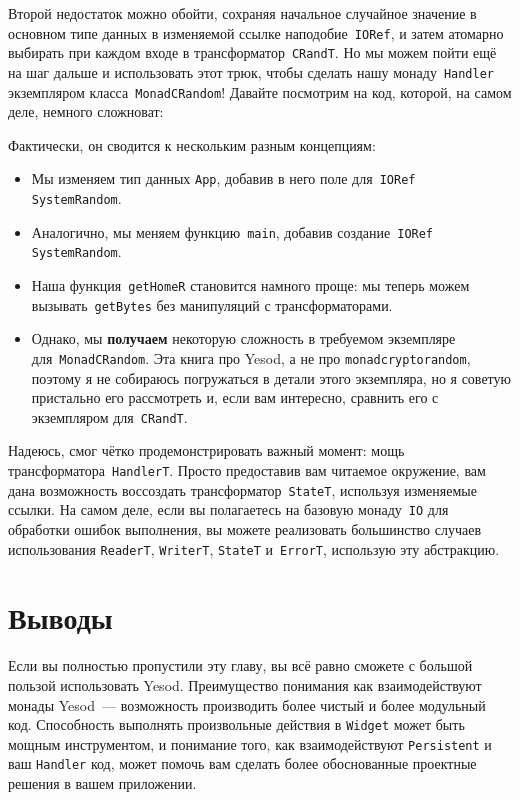 Второй недостаток можно обойти, сохраняя начальное случайное значение в
основном типе данных в изменяемой ссылке наподобие~\lstinline'IORef', и затем
атомарно выбирать при каждом входе в трансформатор~\lstinline'CRandT'. Но мы
можем пойти ещё на шаг дальше и использовать этот трюк, чтобы сделать нашу
монаду~\lstinline'Handler' экземпляром класса~\lstinline'MonadCRandom'!
Давайте посмотрим на код, которой, на самом деле, немного сложноват:


Фактически, он сводится к нескольким разным концепциям:
\begin{itemize}
    \item Мы изменяем тип данных \lstinline'App', добавив в него поле
        для~\lstinline'IORef SystemRandom'.

    \item Аналогично, мы меняем функцию~\lstinline'main', добавив
        создание~\lstinline'IORef SystemRandom'.

    \item Наша функция~\lstinline'getHomeR' становится намного проще: мы теперь
        можем вызывать~\lstinline'getBytes' без манипуляций с трансформаторами.

    \item Однако, мы \textbf{получаем} некоторую сложность в требуемом
        экземпляре для~\lstinline'MonadCRandom'. Эта книга про Yesod, а не про
        \texttt{monadcryptorandom}, поэтому я не собираюсь погружаться в детали
        этого экземпляра, но я советую пристально его рассмотреть и, если вам
        интересно, сравнить его с экземпляром для~\lstinline'CRandT'.
\end{itemize}

Надеюсь, смог чётко продемонстрировать важный момент: мощь
трансформатора~\lstinline'HandlerT'. Просто предоставив вам читаемое окружение,
вам дана возможность воссоздать трансформатор~\lstinline'StateT', используя
изменяемые ссылки. На самом деле, если вы полагаетесь на базовую
монаду~\lstinline'IO' для обработки ошибок выполнения, вы можете реализовать
большинство случаев использования \lstinline'ReaderT', \lstinline'WriterT',
\lstinline'StateT' и~\lstinline'ErrorT', использую эту абстракцию.

\section{Выводы}
Если вы полностью пропустили эту главу, вы всё равно сможете с большой пользой
использовать Yesod. Преимущество понимания как взаимодействуют монады
Yesod~--- возможность производить более чистый и более модульный код. Способность
выполнять произвольные действия в \lstinline'Widget' может быть мощным инструментом, и
понимание того, как взаимодействуют \lstinline'Persistent' и ваш \lstinline'Handler' код,
может помочь вам сделать более обоснованные проектные решения в вашем приложении.

